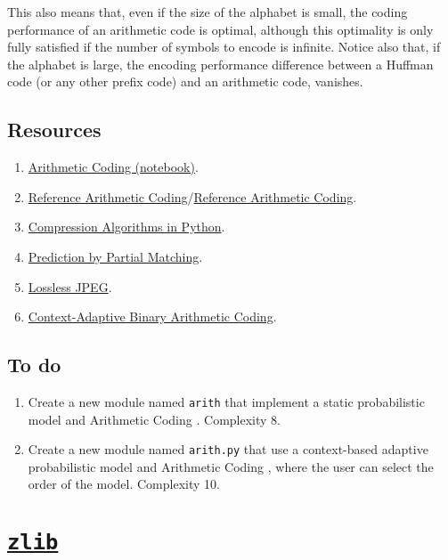 This also means that, even if the size of the alphabet is small, the
coding performance of an arithmetic code is optimal, although this
optimality is only fully satisfied if the number of symbols to encode
is infinite. Notice also that, if the alphabet is large, the encoding
performance difference between a Huffman code (or any other prefix
code) and an arithmetic code, vanishes.

\subsection*{Resources}
\begin{enumerate}
\item
  \href{https://github.com/vicente-gonzalez-ruiz/arithmetic_coding/blob/master/src/arithmetic_coding/arithmetic_coding.ipynb}{Arithmetic
    Coding (notebook)}.
\item \href{https://www.nayuki.io/page/reference-arithmetic-coding}{Reference Arithmetic Coding}/\href{https://github.com/nayuki/Reference-arithmetic-coding}{Reference Arithmetic Coding}.
\item \href{https://www.inference.org.uk/mackay/python/compress/#AC}{Compression Algorithms in Python}.
\item \href{https://en.wikipedia.org/wiki/Prediction_by_partial_matching}{Prediction by Partial Matching}.
\item \href{https://en.wikipedia.org/wiki/Lossless_JPEG}{Lossless JPEG}.
\item \href{https://en.wikipedia.org/wiki/Context-adaptive_binary_arithmetic_coding}{Context-Adaptive Binary Arithmetic Coding}.
\end{enumerate}

\subsection*{To do}
\begin{enumerate}
\item Create a new module named \texttt{arith} that implement a static
  probabilistic model and Arithmetic Coding
  \cite{nelson96datacompression}. Complexity 8.
\item Create a new module named \texttt{arith.py} that use
  a context-based adaptive probabilistic model and Arithmetic Coding
  \cite{nelson96datacompression}, where the user can select the order
  of the model. Complexity 10.
\end{enumerate}

\section{\href{https://zlib.net/}{\texttt{zlib}}}

